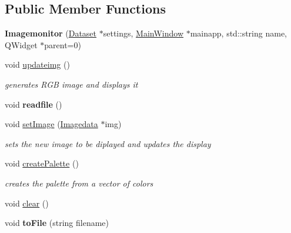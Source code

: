 \subsection*{Public Member Functions}
\begin{DoxyCompactItemize}
\item 
\hypertarget{class_imagemonitor_a1c0bf4241ee837b9b35d1c58a2ea2b00}{
{\bfseries Imagemonitor} (\hyperlink{class_dataset}{Dataset} $\ast$settings, \hyperlink{class_main_window}{MainWindow} $\ast$mainapp, std::string name, QWidget $\ast$parent=0)}
\label{class_imagemonitor_a1c0bf4241ee837b9b35d1c58a2ea2b00}

\item 
void \hyperlink{class_imagemonitor_ab690a689570031692fa720533e0295c1}{updateimg} ()
\begin{DoxyCompactList}\small\item\em generates RGB image and displays it \item\end{DoxyCompactList}\item 
\hypertarget{class_imagemonitor_a58d50d7116ec1c67b1551d6f2ee1d727}{
void {\bfseries readfile} ()}
\label{class_imagemonitor_a58d50d7116ec1c67b1551d6f2ee1d727}

\item 
\hypertarget{class_imagemonitor_a2a22ba712d600d321c41e80b51c0f17e}{
void \hyperlink{class_imagemonitor_a2a22ba712d600d321c41e80b51c0f17e}{setImage} (\hyperlink{class_imagedata}{Imagedata} $\ast$img)}
\label{class_imagemonitor_a2a22ba712d600d321c41e80b51c0f17e}

\begin{DoxyCompactList}\small\item\em sets the new image to be diplayed and updates the display \item\end{DoxyCompactList}\item 
void \hyperlink{class_imagemonitor_ad28d3ed34ad3767cc83e3e2f5240f220}{createPalette} ()
\begin{DoxyCompactList}\small\item\em creates the palette from a vector of colors \item\end{DoxyCompactList}\item 
void \hyperlink{class_imagemonitor_ae7e969d70d78493c0ac62e683ba5beec}{clear} ()
\item 
\hypertarget{class_imagemonitor_acd3d0eb4f78a1cd83d45cf653eeccfdd}{
void {\bfseries toFile} (string filename)}
\label{class_imagemonitor_acd3d0eb4f78a1cd83d45cf653eeccfdd}


\end{DoxyCompactItemize}
